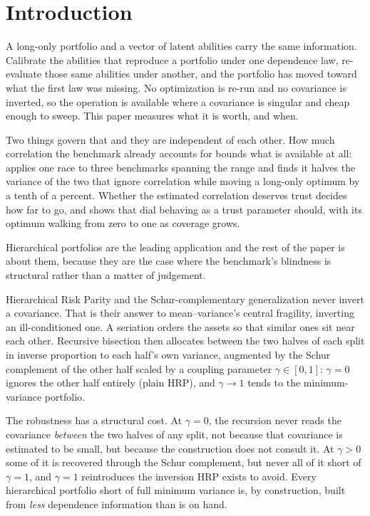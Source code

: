 \documentclass[11pt]{article}
\begin{document}
\section{Introduction}

A long-only portfolio and a vector of latent abilities carry the same
information. Calibrate the abilities that reproduce a portfolio under one
dependence law, re-evaluate those same abilities under another, and the
portfolio has moved toward what the first law was missing. No optimization is
re-run and no covariance is inverted, so the operation is available where a
covariance is singular and cheap enough to sweep. This paper measures what it
is worth, and when.

Two things govern that and they are independent of each other. How much
correlation the benchmark already accounts for bounds what is available at
all:  applies one race to three benchmarks spanning the
range and finds it halves the variance of the two that ignore correlation
while moving a long-only optimum by a tenth of a percent. Whether the
estimated correlation deserves trust decides how far to go, and
 shows that dial behaving as a trust parameter should, with its
optimum walking from zero to one as coverage grows.

Hierarchical portfolios are the leading application and the rest of the paper
is about them, because they are the case where the benchmark's blindness is
structural rather than a matter of judgement.

Hierarchical Risk Parity \parencite{lopezdeprado2016} and the
Schur-complementary generalization \parencite{cotton2024schur} never invert a
covariance. That is their answer to mean--variance's central fragility,
inverting an ill-conditioned one. A seriation orders the assets so that
similar ones sit near each other. Recursive bisection then allocates between
the two halves of each split in inverse proportion to each half's own
variance, augmented by the Schur complement of the other half scaled by a
coupling parameter $\gamma\in[0,1]$: $\gamma=0$ ignores the other half
entirely (plain HRP), and $\gamma\to1$ tends to the minimum-variance
portfolio.

The robustness has a structural cost. At $\gamma=0$, the recursion never
reads the covariance \emph{between} the two halves of any split, not because
that covariance is estimated to be small, but because the construction does
not consult it. At $\gamma>0$ some of it is recovered through the Schur
complement, but never all of it short of $\gamma=1$, and $\gamma=1$
reintroduces the inversion HRP exists to avoid. Every hierarchical portfolio
short of full minimum variance is, by construction, built from
\emph{less} dependence information than is on hand.
\end{document}
